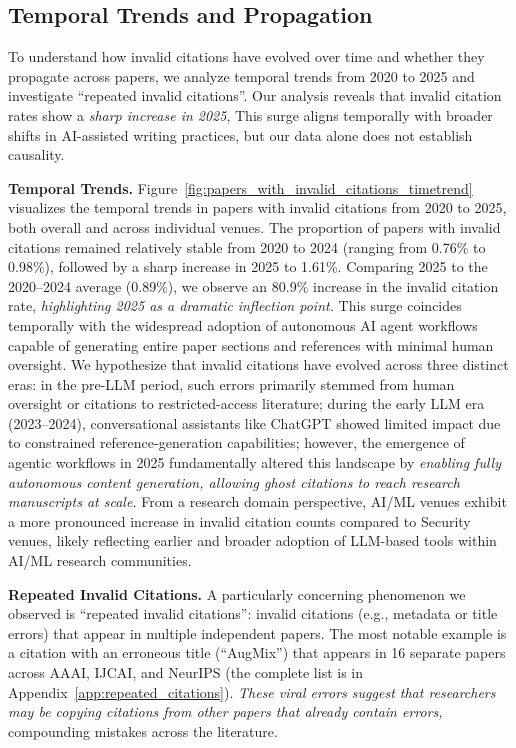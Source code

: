 \subsection{Temporal Trends and Propagation}

To understand how invalid citations have evolved over time and whether they propagate across papers, we analyze temporal trends from 2020 to 2025 and investigate ``repeated invalid citations''.
Our analysis reveals that invalid citation rates show a \textit{sharp increase in 2025}, This surge aligns temporally with broader shifts in AI-assisted writing practices, but our data alone does not establish causality.

\noindent\textbf{Temporal Trends.}
Figure~\ref{fig:papers_with_invalid_citations_timetrend} visualizes the temporal trends in papers with invalid citations from 2020 to 2025, both overall and across individual venues.
The proportion of papers with invalid citations remained relatively stable from 2020 to 2024 (ranging from 0.76\% to 0.98\%), followed by a sharp increase in 2025 to 1.61\%. Comparing 2025 to the 2020--2024 average (0.89\%), we observe an 80.9\% increase in the invalid citation rate, \textit{highlighting 2025 as a dramatic inflection point.} 
This surge coincides temporally with the widespread adoption of autonomous AI agent workflows capable of generating entire paper sections and references with minimal human oversight.
We hypothesize that invalid citations have evolved across three distinct eras: in the pre-LLM period, such errors primarily stemmed from human oversight or citations to restricted-access literature; during the early LLM era (2023--2024), conversational assistants like ChatGPT showed limited impact due to constrained reference-generation capabilities; however, the emergence of agentic workflows in 2025 fundamentally altered this landscape by \textit{enabling fully autonomous content generation, allowing ghost citations to reach research manuscripts at scale.}
From a research domain perspective, AI/ML venues exhibit a more pronounced increase in invalid citation counts compared to Security venues, likely reflecting earlier and broader adoption of LLM-based tools within AI/ML research communities.



\noindent
\textbf{Repeated Invalid Citations.}
A particularly concerning phenomenon we observed is ``repeated invalid citations'': invalid citations (e.g., metadata or title errors) that appear in multiple independent papers.
The most notable example is a citation with an erroneous title (``AugMix'') that appears in 16 separate papers across AAAI, IJCAI, and NeurIPS (the complete list is in Appendix~\ref{app:repeated_citations}).
\textit{These viral errors suggest that researchers may be copying citations from other papers that already contain errors,} compounding mistakes across the literature.

